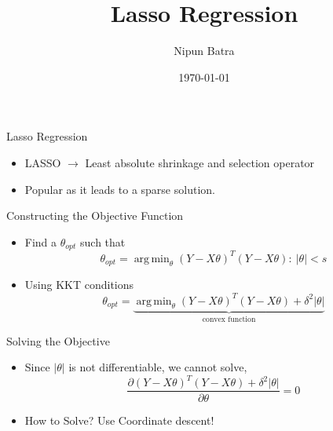 \documentclass{beamer}
\title{Lasso Regression}
\date{\today}
\author{Nipun Batra}
\institute{IIT Gandhinagar}
\DeclareMathOperator*{\argmin}{arg\,min}
\begin{document}
  \maketitle
  
  
  
  

\begin{frame}{Lasso Regression}
\begin{itemize}
	
	
	\item LASSO $\longrightarrow$ Least absolute shrinkage and selection operator
	\item Popular as it leads to a sparse solution.
	
\end{itemize}
\end{frame}

\begin{frame}{Constructing the Objective Function}
\begin{itemize}

\item Find a $\theta_{opt}$ such that  \begin{equation}    \theta_{opt} =  \argmin_{\theta} {(Y-X\theta)^T(Y-X\theta)} : \ |\theta|<s \end{equation}
\item Using KKT conditions
\begin{equation}
    \theta_{opt} = \underbrace{\argmin_{\theta}{(Y-X\theta)^T(Y-X\theta) + \delta^2|\theta|}}_\text{convex function}
\end{equation}
	
\end{itemize}


\end{frame}

\begin{frame}{Solving the Objective}
\begin{itemize}

\item Since $|\theta|$ is not differentiable, we cannot solve,  \begin{equation}    \frac{\partial {(Y-X\theta)^T(Y-X\theta) + \delta^2|\theta|}}{\partial \theta} = 0 \end{equation}

\item How to Solve?
Use Coordinate descent!
\end{itemize}

\end{frame}
\end{document}
